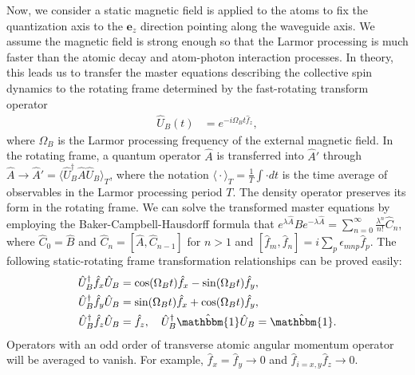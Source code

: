 \documentclass[aps,pra,twocolumn,superscriptaddress]{revtex4-1} %
\newcommand{\expect}[1]{\big\langle #1 \big\rangle}
\begin{document}
\begin{appendix}
Now, we consider a static magnetic field is applied to the atoms to fix the quantization axis to the $ \mathbf{e}_{z} $ direction pointing along the waveguide axis.
We assume the magnetic field is strong enough so that the Larmor processing is much faster than the atomic decay and atom-photon interaction processes.
In theory, this leads us to transfer the master equations describing the collective spin dynamics to the rotating frame determined by the fast-rotating transform operator
\begin{align}
\hat{U}_B(t) &= e^{-i\Omega_Bt\hat{f}_z},
\end{align}
where $ \Omega_B $ is the Larmor processing frequency of the external magnetic field.
In the rotating frame, a quantum operator $ \hat{A} $ is transferred into $ \hat{A}' $ through $ \hat{A}\rightarrow \hat{A}'=\expect{\hat{U}_B^\dagger\hat{A}\hat{U}_B }_T $, where the notation $ \expect{\cdot}_T=\frac{1}{T}\int\cdot dt $ is the time average of observables in the Larmor processing period $ T $.
The density operator preserves its form in the rotating frame.
We can solve the transformed master equations by employing the Baker-Campbell-Hausdorff formula that $ e^{\lambda\hat{A}}\hat{B}e^{-\lambda\hat{A}}=\sum_{n=0}^\infty\frac{\lambda^n}{n!}\hat{C}_n $, where $ \hat{C}_0=\hat{B} $ and $ \hat{C}_n=\left[\hat{A},\hat{C}_{n-1} \right] $ for $ n>1 $ and $ \left[\hat{f}_m, \hat{f}_n\right]=i\sum_p\epsilon_{mnp}\hat{f}_p $.
The following static-rotating frame transformation relationships can be proved easily:
\begin{subequations}\label{eq:rotationtransf}
	\begin{align}
	\hat{U}_B^\dagger\hat{f}_{x}\hat{U}_B&=\cos(\Omega_Bt)\hat{f}_x-\sin(\Omega_Bt)\hat{f}_y,\\
	\hat{U}_B^\dagger\hat{f}_{y}\hat{U}_B &= \sin(\Omega_Bt)\hat{f}_x+ \cos(\Omega_Bt)\hat{f}_y, \\ \hat{U}_B^\dagger\hat{f}_{z}\hat{U}_B &=\hat{f}_z,\quad \hat{U}_B^\dagger\hat{\mathbbm{1}}\hat{U}_B =\hat{\mathbbm{1}}.
	\end{align}
\end{subequations}
Operators with an odd order of transverse atomic angular momentum operator will be averaged to vanish. For example, $ \hat{f}_{x}=\hat{f}_{y} \rightarrow 0 $ and $ \hat{f}_{i=x,y}\hat{f}_{z}\rightarrow 0 $.



\end{appendix}
\end{document}
